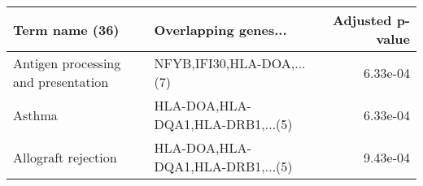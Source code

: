 \begin{tabular}{llr}
\toprule
                     Term name (36) &             Overlapping genes... &  Adjusted p-value \\
\midrule
Antigen processing and presentation &        NFYB,IFI30,HLA-DOA,...(7) &          6.33e-04 \\
                             Asthma & HLA-DOA,HLA-DQA1,HLA-DRB1,...(5) &          6.33e-04 \\
                Allograft rejection & HLA-DOA,HLA-DQA1,HLA-DRB1,...(5) &          9.43e-04 \\
\bottomrule
\end{tabular}
